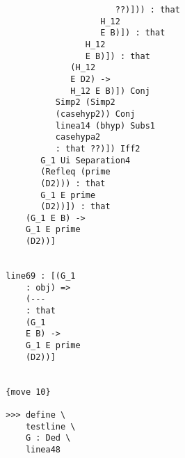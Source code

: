 \documentclass[12pt]{article}
\begin{document}
\begin{verbatim}
                                                       ??)])) : that 
                                                    H_12 
                                                    E B)]) : that 
                                                 H_12 
                                                 E B)]) : that 
                                              (H_12 
                                              E D2) -> 
                                              H_12 E B)]) Conj 
                                           Simp2 (Simp2 
                                           (casehyp2)) Conj 
                                           linea14 (bhyp) Subs1 
                                           casehypa2 
                                           : that ??)]) Iff2 
                                        G_1 Ui Separation4 
                                        (Refleq (prime 
                                        (D2))) : that 
                                        G_1 E prime 
                                        (D2))]) : that 
                                     (G_1 E B) -> 
                                     G_1 E prime 
                                     (D2))]


                                 line69 : [(G_1 
                                     : obj) => 
                                     (--- 
                                     : that 
                                     (G_1 
                                     E B) -> 
                                     G_1 E prime 
                                     (D2))]


                                 {move 10}

                                 >>> define \
                                     testline \
                                     G : Ded \
                                     linea48



\end{verbatim}
\end{document}

